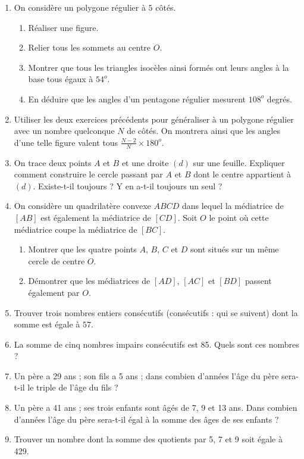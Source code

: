 \documentclass[14pt]{extreport}
\theoremstyle{plain}
\begin{document}
\begin{enumerate}
 \item On considère un polygone régulier à $5$ côtés.
 \begin{enumerate}
 \item Réaliser une figure.
 \item Relier tous les sommets au centre $O$. 
 \item Montrer que tous les triangles isocèles ainsi formés ont leurs angles à la base tous égaux à $54^o$. 
 \item En déduire que les angles d'un pentagone régulier mesurent $108^o$ degrés.
\end{enumerate}   
\item Utiliser les deux exercices précédents pour généraliser à un polygone régulier avec un nombre quelconque $N$ de côtés. On montrera ainsi que les angles d'une telle figure valent tous $\frac{N-2}N\times 180^o$.
\item On trace deux points $A$ et $B$ et une droite $(d)$ sur une feuille. Expliquer comment construire le cercle passant par $A$ et $B$ dont le centre appartient à $(d)$. Existe-t-il toujours ? Y en a-t-il toujours un seul ?
\item On considère un quadrilatère convexe $ABCD$ dans lequel la médiatrice de 
$[AB]$ est également la médiatrice de $[CD]$. Soit $O$ le point où cette médiatrice coupe la médiatrice de $[BC]$. \begin{enumerate}
\item Montrer que les quatre points $A$, $B$, $C$ et $D$ sont situés sur un même cercle de centre $O$. 
\item Démontrer que les médiatrices de $[AD]$, $[AC]$ et $[BD]$ passent également par $O$. 
\end{enumerate}
 \item Trouver trois nombres entiers consécutifs (consécutifs : qui se suivent) dont la somme est égale à $57$. 
 \item La somme de cinq nombres impairs consécutifs est 85. Quels sont ces nombres ? 
 \item Un père a 29 ans ; son fils a 5 ans ; dans combien d'années l'âge du père sera-t-il le triple de l'âge du fils ? 
 \item Un père a 41 ans ; ses trois enfants sont âgés de 7, 9 et 13 ans. Dans combien d'années l'âge du père sera-t-il égal à la somme des âges de ses enfants ? 
 \item Trouver un nombre dont la somme des quotients par 5, 7 et 9 soit égale à 429. 
 
\end{enumerate} 
 
\end{document}
